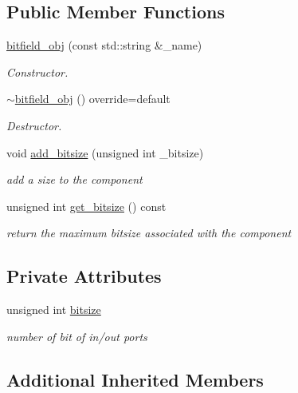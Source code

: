 \subsection*{Public Member Functions}
\begin{DoxyCompactItemize}
\item 
\hyperlink{classbitfield__obj_ab89190bae39ae2a0f8573c91016efa41}{bitfield\+\_\+obj} (const std\+::string \&\+\_\+name)
\begin{DoxyCompactList}\small\item\em Constructor. \end{DoxyCompactList}\item 
\hyperlink{classbitfield__obj_ae308c7cff55b47ec402a9e8d37bec04d}{$\sim$bitfield\+\_\+obj} () override=default
\begin{DoxyCompactList}\small\item\em Destructor. \end{DoxyCompactList}\item 
void \hyperlink{classbitfield__obj_a7788e2494e5c7e196f4853f10bad69a5}{add\+\_\+bitsize} (unsigned int \+\_\+bitsize)
\begin{DoxyCompactList}\small\item\em add a size to the component \end{DoxyCompactList}\item 
unsigned int \hyperlink{classbitfield__obj_a20e1f70d8c43a9bbaa09d15680954593}{get\+\_\+bitsize} () const
\begin{DoxyCompactList}\small\item\em return the maximum bitsize associated with the component \end{DoxyCompactList}\end{DoxyCompactItemize}
\subsection*{Private Attributes}
\begin{DoxyCompactItemize}
\item 
unsigned int \hyperlink{classbitfield__obj_afe152fe210b57786fd792c1dcfc9b832}{bitsize}
\begin{DoxyCompactList}\small\item\em number of bit of in/out ports \end{DoxyCompactList}\end{DoxyCompactItemize}
\subsection*{Additional Inherited Members}


